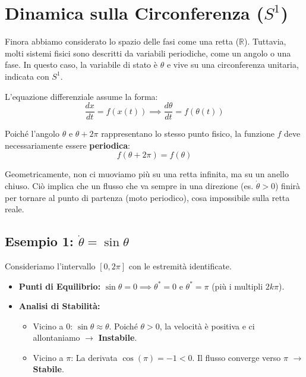 \documentclass[openany]{book}
\theoremstyle{definition}
\theoremstyle{remark}
\begin{document}
\section{Dinamica sulla Circonferenza\texorpdfstring{ ($S^1$)}{S1}}

Finora abbiamo considerato lo spazio delle fasi come una retta ($\mathbb{R}$). Tuttavia, molti sistemi fisici sono descritti da variabili periodiche, come un angolo o una fase.
In questo caso, la variabile di stato è $\theta$ e vive su una circonferenza unitaria, indicata con $S^1$.

L'equazione differenziale assume la forma:
\[ \frac{dx}{dt} = f(x(t)) \implies \frac{d\theta}{dt} = f(\theta(t)) \]

Poiché l'angolo $\theta$ e $\theta + 2\pi$ rappresentano lo stesso punto fisico, la funzione $f$ deve necessariamente essere \textbf{periodica}:
\[ f(\theta + 2\pi) = f(\theta) \]

Geometricamente, non ci muoviamo più su una retta infinita, ma su un anello chiuso. Ciò implica che un flusso che va sempre in una direzione (es. $\dot{\theta} > 0$) finirà per tornare al punto di partenza (moto periodico), cosa impossibile sulla retta reale.

\subsection*{Esempio 1: $\dot{\theta} = \sin \theta$}
Consideriamo l'intervallo $[0, 2\pi]$ con le estremità identificate.
\begin{itemize}
    \item \textbf{Punti di Equilibrio:} $\sin \theta = 0 \implies \theta^* = 0$ e $\theta^* = \pi$ (più i multipli $2k\pi$).
    \item \textbf{Analisi di Stabilità:}
    \begin{itemize}
        \item Vicino a $0$: $\sin \theta \approx \theta$. Poiché $\theta > 0$, la velocità è positiva e ci allontaniamo $\to$ \textbf{Instabile}.
        \item Vicino a $\pi$: La derivata $\cos(\pi) = -1 < 0$. Il flusso converge verso $\pi$ $\to$ \textbf{Stabile}.
    \end{itemize}
\end{itemize}
\end{document}
